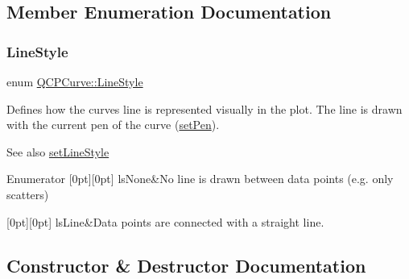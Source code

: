 \subsection{Member Enumeration Documentation}
\mbox{\label{class_q_c_p_curve_a2710e9f79302152cff794c6e16cc01f1}} 
\subsubsection{\texorpdfstring{Line\+Style}{LineStyle}}
{\footnotesize\ttfamily enum \hyperlink{class_q_c_p_curve_a2710e9f79302152cff794c6e16cc01f1}{Q\+C\+P\+Curve\+::\+Line\+Style}}

Defines how the curve\textquotesingle{}s line is represented visually in the plot. The line is drawn with the current pen of the curve (\hyperlink{class_q_c_p_abstract_plottable_ab74b09ae4c0e7e13142fe4b5bf46cac7}{set\+Pen}). \begin{DoxySeeAlso}{See also}
\hyperlink{class_q_c_p_curve_a4a377ec863ff81a1875c3094a6177c19}{set\+Line\+Style} 
\end{DoxySeeAlso}
\begin{DoxyEnumFields}{Enumerator}
[0pt][0pt]{}\mbox{\label{class_q_c_p_curve_a2710e9f79302152cff794c6e16cc01f1aec1601a191cdf0b4e761c4c66092cc48}} 
ls\+None&No line is drawn between data points (e.\+g. only scatters) \\
\hline

[0pt][0pt]{}\mbox{\label{class_q_c_p_curve_a2710e9f79302152cff794c6e16cc01f1ade5822ce6fbf131d3df131795c2e1003}} 
ls\+Line&Data points are connected with a straight line. \\
\hline

\end{DoxyEnumFields}


\subsection{Constructor \& Destructor Documentation}
\mbox{\label{class_q_c_p_curve_a36de58e2652b3fa47bdf9187d421d3ce}} 
